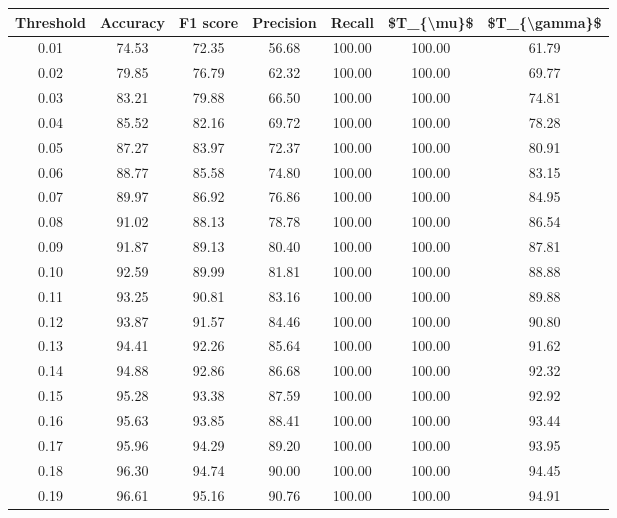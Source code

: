 \begin{tabular}{|c|c|c|c|c|c|c|}
\hline
 Threshold &  Accuracy &  F1 score &  Precision &  Recall &  \$T\_\{\textbackslash mu\}\$ &  \$T\_\{\textbackslash gamma\}\$ \\
\hline
      0.01 &     74.53 &     72.35 &      56.68 &  100.00 &     100.00 &         61.79 \\
      0.02 &     79.85 &     76.79 &      62.32 &  100.00 &     100.00 &         69.77 \\
      0.03 &     83.21 &     79.88 &      66.50 &  100.00 &     100.00 &         74.81 \\
      0.04 &     85.52 &     82.16 &      69.72 &  100.00 &     100.00 &         78.28 \\
      0.05 &     87.27 &     83.97 &      72.37 &  100.00 &     100.00 &         80.91 \\
      0.06 &     88.77 &     85.58 &      74.80 &  100.00 &     100.00 &         83.15 \\
      0.07 &     89.97 &     86.92 &      76.86 &  100.00 &     100.00 &         84.95 \\
      0.08 &     91.02 &     88.13 &      78.78 &  100.00 &     100.00 &         86.54 \\
      0.09 &     91.87 &     89.13 &      80.40 &  100.00 &     100.00 &         87.81 \\
      0.10 &     92.59 &     89.99 &      81.81 &  100.00 &     100.00 &         88.88 \\
      0.11 &     93.25 &     90.81 &      83.16 &  100.00 &     100.00 &         89.88 \\
      0.12 &     93.87 &     91.57 &      84.46 &  100.00 &     100.00 &         90.80 \\
      0.13 &     94.41 &     92.26 &      85.64 &  100.00 &     100.00 &         91.62 \\
      0.14 &     94.88 &     92.86 &      86.68 &  100.00 &     100.00 &         92.32 \\
      0.15 &     95.28 &     93.38 &      87.59 &  100.00 &     100.00 &         92.92 \\
      0.16 &     95.63 &     93.85 &      88.41 &  100.00 &     100.00 &         93.44 \\
      0.17 &     95.96 &     94.29 &      89.20 &  100.00 &     100.00 &         93.95 \\
      0.18 &     96.30 &     94.74 &      90.00 &  100.00 &     100.00 &         94.45 \\
      0.19 &     96.61 &     95.16 &      90.76 &  100.00 &     100.00 &         94.91 \\

\end{tabular}
